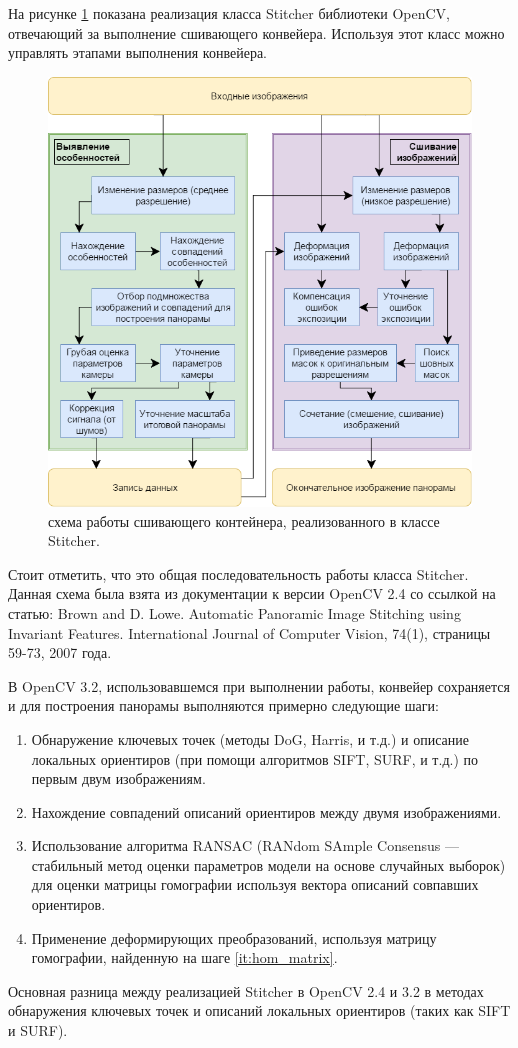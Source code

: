 На рисунке \ref{img:pipeline} показана реализация класса Stitcher библиотеки OpenCV, отвечающий за выполнение сшивающего конвейера. Используя этот класс можно управлять этапами выполнения конвейера.

\begin{figure}[h!]
	\includegraphics[width = \linewidth]{img/pipeline}
	\caption{схема работы сшивающего контейнера, реализованного в классе Stitcher.}
	\label{img:pipeline}
\end{figure}

Стоит отметить, что это общая последовательность работы класса Stitcher. Данная схема была взята из документации к версии OpenCV 2.4 со ссылкой на статью: Brown and D. Lowe. Automatic Panoramic Image Stitching using Invariant Features. International Journal of Computer Vision, 74(1), страницы 59-73, 2007 года.

В OpenCV 3.2, использовавшемся при выполнении работы, конвейер сохраняется и для построения панорамы выполняются примерно следующие шаги:

\begin{enumerate}
	\item Обнаружение ключевых точек (методы DoG, Harris, и т.д.) и описание локальных ориентиров (при помощи алгоритмов SIFT, SURF, и т.д.) по первым двум изображениям.
	\item Нахождение совпадений описаний ориентиров между двумя изображениями.
	\item \label{it:hom_matrix} Использование алгоритма RANSAC (RANdom SAmple Consensus — стабильный метод оценки параметров модели на основе случайных выборок) для оценки матрицы гомографии используя вектора описаний совпавших ориентиров.
	\item Применение деформирующих преобразований, используя матрицу гомографии, найденную на шаге \ref{it:hom_matrix}.
\end{enumerate}

Основная разница между реализацией Stitcher в OpenCV 2.4 и 3.2 в методах обнаружения ключевых точек и описаний локальных ориентиров (таких как SIFT и SURF).